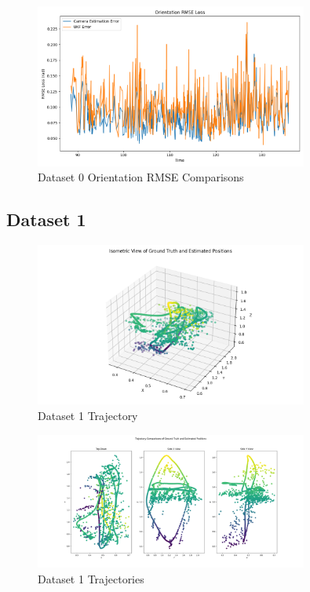 \documentclass{article}
\begin{document}
\begin{figure}[H]
    \centering
    \includegraphics[width=0.8\textwidth]{./imgs/task4/studentdata0_ukf_orientation_rmse.png}
    \caption{Dataset 0 Orientation RMSE Comparisons}
\end{figure}

\subsection*{Dataset 1}

\begin{figure}[H]
    \centering
    \includegraphics[width=0.8\textwidth]{./imgs/task4/studentdata1_ukf_isometric.png}
    \caption{Dataset 1 Trajectory}
\end{figure}

\begin{figure}[H]
    \centering
    \includegraphics[width=0.8\textwidth]{./imgs/task4/studentdata1_ukf_positions.png}
    \caption{Dataset 1 Trajectories}
\end{figure}
\end{document}
